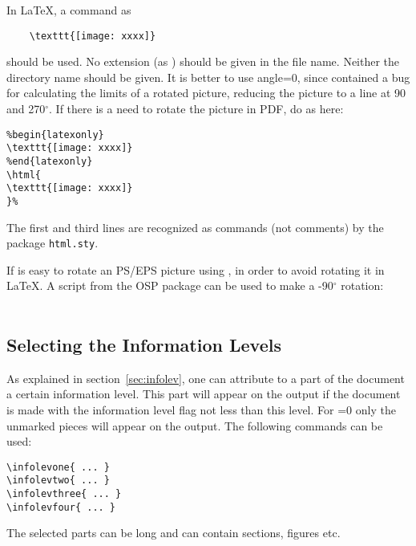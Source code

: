 \documentclass[12pt,letterpaper]{article}
\newcommand{\myil}[0]{{\color{red}{\em infolevel}}}
\begin{document}
  In \LaTeX{}, a command as
  {\color{blue}
  \begin{verbatim}
    \texttt{[image: xxxx]}
  \end{verbatim}
  } \noindent
  should be used. No extension (as ) should be
  given in the file name. Neither the directory name
   should be given.
  It is better to use angle=0, since
    contained a bug for calculating
    the limits of a rotated picture, reducing the picture to a line
    at 90 and 270$^{\circ}$. If there is a need to rotate
    the picture in PDF, do as here:
  {\color{blue}
  \begin{verbatim}
%begin{latexonly}
\texttt{[image: xxxx]}
%end{latexonly}
\html{
\texttt{[image: xxxx]}
}%
  \end{verbatim}%
  }\noindent%
  The first and third lines are recognized as commands (not comments)
  by the package {\color{blue}\verb|html.sty|}.

  If is easy to rotate an PS/EPS picture using , in
  order to avoid rotating it in \LaTeX{}. A script from the OSP package
  can be used to make a -90$^\circ$ rotation: \\
\\

\subsection{Selecting the Information Levels}
\label{sec:selinfolev}

  As explained in section~\ref{sec:infolev}, one can attribute to a
  part of the document a certain information level.
  This part will appear on the output if the document is made
  with the information level flag \myil{} not less than this level.
  For \myil{}=0 only the unmarked pieces will appear on the output.
  The following commands can be used:
  {\color{blue}
   \begin{verbatim}
\infolevone{ ... }
\infolevtwo{ ... }
\infolevthree{ ... }
\infolevfour{ ... }
  \end{verbatim}%
  }\noindent
  The selected parts can be long and can contain sections, figures etc.
\end{document}
